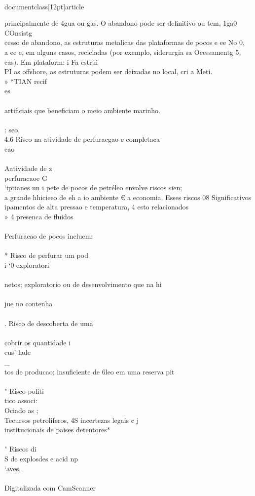 \\documentclass[12pt]{article}
\begin{document}
principalmente de 4gua ou gas. O abandono pode ser definitivo ou tem, 1ga0 COnsistg\\
cesso de abandono, as estruturas metalicas das plataformas de pocos e ee No 0,\\
a ee e, em alguns casos, recicladas (por exemplo, siderurgia sa Ocessamentg 5,\\
cas). Em plataform: i Fa estrui\\
PI as offshore, as estruturas podem ser deixadas no local, cri a Meti.\\
» “TIAN recif\\
es\\
\\
artificiais que beneficiam o meio ambiente marinho.\\
\\
: seo,\\
4.6 Risco na atividade de perfuracgao e completaca\\
cao\\
\\
Aatividade de z\\
perfuracaoe G\\
‘iptianes un i pete de pocos de petréleo envolve riscos sien;\\
a grande hhicieeo de eh a io ambiente € a economia. Esses riscos 08 Significativos\\
ipamentos de alta pressao e temperatura, 4 esto relacionados\\
» 4 presenca de fluidos\\
\\
Perfuracao de pocos incluem:\\
\\
* Risco de perfurar um pod\\
i ‘0 exploratori\\
\\
netos; exploratorio ou de desenvolvimento que na hi\\
\\
jue no contenha\\
\\
. Risco de descoberta de uma\\
\\
cobrir os quantidade i\\
cus' lade \\_\\
tos de producao; insuficiente de 6leo em uma reserva pit\\
\\
" Risco politi\\
tico associ:\\
Ociado as ;\\
Tecursos petroliferos, 4S incertezas legais ¢ j\\
institucionais de paises detentores*\\
\\
" Riscos di\\
S de explosdes e acid np\\
‘aves,\\
\\
Digitalizada com CamScanner\\
\end{document}
